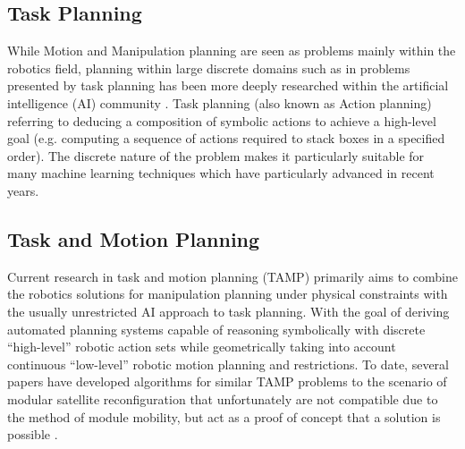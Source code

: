 \subsection{Task Planning}
While Motion and Manipulation planning are seen as problems mainly within the robotics field, planning within large discrete domains such as in problems presented by task planning has been more deeply researched within the artificial intelligence (AI) community \cite{ghallab2004automated}. Task planning (also known as Action planning) referring to deducing a composition of symbolic actions to achieve a high-level goal (e.g. computing a sequence of actions required to stack boxes in a specified order). The discrete nature of the problem makes it particularly suitable for many machine learning techniques which have particularly advanced in recent years.
\pagebreak
\subsection{Task and Motion Planning}
Current research in task and motion planning (TAMP) primarily aims to combine the robotics solutions for manipulation planning under physical constraints with the usually unrestricted AI approach to task planning. With the goal of deriving automated planning systems capable of reasoning symbolically with discrete “high-level” robotic action sets while geometrically taking into account continuous “low-level” robotic motion planning and restrictions. To date, several papers have developed algorithms for similar TAMP problems to the scenario of modular satellite reconfiguration that unfortunately are not compatible due to the method of module mobility, but act as a proof of concept that a solution is possible \cite{1013348, 8206101, 7091046}.

